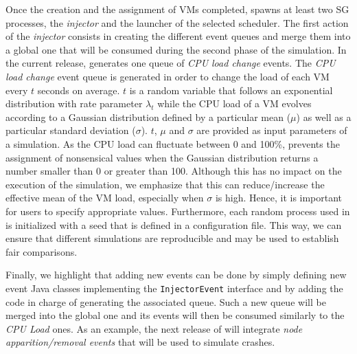 Once the creation and the assignment of VMs completed, \vmps spawns at
least two SG processes, the \emph{injector} and the launcher of the
selected scheduler.  The first action of the \emph{injector} consists
in creating the different event queues and merge them into a global
one that will be consumed during the second phase of the simulation.
In the current release, \vmps generates one queue of \emph{CPU load change} events.
%
The \emph{CPU load change} event queue is generated in order to change the
load of each VM every $t$ seconds on average. $t$ is a random variable
that follows an exponential distribution with rate parameter
$\lambda_t$ while the CPU load of a VM evolves according to a Gaussian
distribution defined by a particular mean ($\mu$) as well as a
particular standard deviation ($\sigma$). $t$, $\mu$ and $\sigma$ are
provided as input parameters of a simulation.  As the CPU load can
fluctuate between 0 and 100\%, \vmps prevents the assignment of
nonsensical values when the Gaussian distribution returns a number
smaller than 0 or greater than 100. Although this has no impact on the
execution of the simulation, we emphasize that this can
reduce/increase the effective mean of the VM load, especially when
$\sigma$ is high.  Hence, it is important for users to specify
appropriate values.
Furthermore, each random process used in \vmps is initialized with a
seed that is defined in a configuration file. This way, we can ensure
that different simulations are reproducible and may be used to
establish fair comparisons.


Finally, we highlight that adding new events can be
done by simply defining new event Java
classes implementing the \texttt{InjectorEvent} interface and by
adding the code in charge of generating the associated queue. Such a
new queue will be merged into the global one and its events will then be
consumed similarly to the \emph{CPU Load} ones.%
As an example, the next release of \vmps will integrate   \emph{node
  apparition/removal events} that will be used to simulate crashes.

